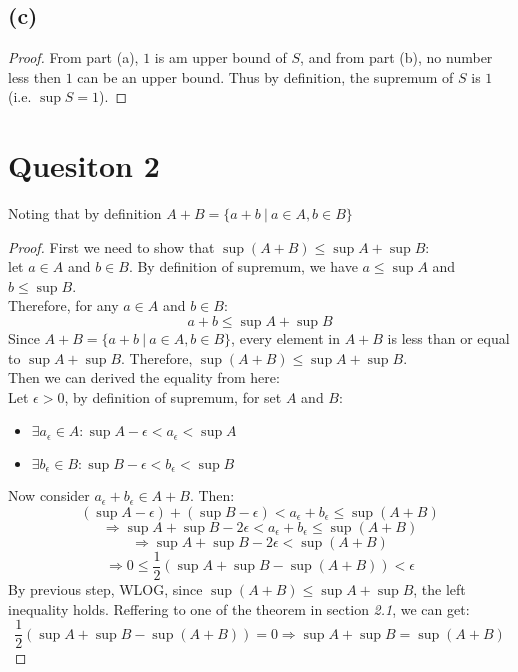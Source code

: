\documentclass{article}
\begin{document}
\subsection*{(c)}
\begin{proof}
    From part (a), $1$ is am upper bound of $S$, and from part (b), no number less then $1$ can be an upper bound.
    Thus by definition, the supremum of $S$ is $1$ (i.e. $\sup S = 1$).
\end{proof}


\section*{Quesiton 2}
Noting that by definition \( A + B = \{ a + b \ | \ a \in A, b \in B \} \)

\begin{proof}
    First we need to show that \( \sup(A + B) \leq \sup A + \sup B \):
    \\
    let $a \in A$ and $b \in B$. By definition of supremum, we have $a \leq \sup A$ and $b \leq \sup B$.
    \\
    Therefore, for any $a \in A$ and $b \in B$:
    \[ a + b \leq \sup A + \sup B \]
    Since \( A + B = \{ a + b \ | \ a \in A, b \in B \} \), every element in $A + B$ is less than or equal to $\sup A + \sup B$.
    Therefore, \( \sup(A + B) \leq \sup A + \sup B \).
    \\
    Then we can derived the equality from here:
    \\
    Let $\epsilon > 0$, by definition of supremum, for set $A$ and $B$:
    \begin{itemize}
        \item \( \exists a_{\epsilon} \in A : \sup A - \epsilon < a_{\epsilon} < \sup A \)
        \item \( \exists b_{\epsilon} \in B : \sup B - \epsilon < b_{\epsilon} < \sup B \)
    \end{itemize}
    Now consider $a_{\epsilon} + b_{\epsilon} \in A + B$. Then:
    \[ (\sup A - \epsilon) + (\sup B - \epsilon) < a_{\epsilon} + b_{\epsilon} \leq \sup (A + B) \]
    \[ \Rightarrow \sup A + \sup B - 2 \epsilon < a_{\epsilon} + b_{\epsilon} \leq \sup (A + B) \]
    \[ \Rightarrow \sup A + \sup B - 2 \epsilon < \sup (A + B) \]
    \[ \Rightarrow 0 \leq \frac{1}{2}(\sup A + \sup B - \sup(A + B)) < \epsilon \]
    By previous step, WLOG, since \( \sup(A + B) \leq \sup A + \sup B \), the left inequality holds.
    Reffering to one of the theorem in section \textit{2.1}, we can get:
    \[ \frac{1}{2}(\sup A + \sup B - \sup(A + B)) = 0 \Rightarrow \sup A + \sup B = \sup(A + B) \]
\end{proof}
\end{document}
